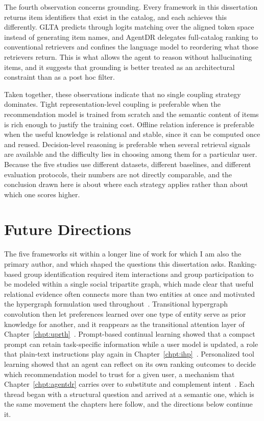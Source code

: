 The fourth observation concerns grounding. Every framework in this dissertation returns item identifiers that exist in the catalog, and each achieves this differently. GLTA predicts through logits matching over the aligned token space instead of generating item names, and AgentDR delegates full-catalog ranking to conventional retrievers and confines the language model to reordering what those retrievers return. This is what allows the agent to reason without hallucinating items, and it suggests that grounding is better treated as an architectural constraint than as a post hoc filter.

Taken together, these observations indicate that no single coupling strategy dominates. Tight representation-level coupling is preferable when the recommendation model is trained from scratch and the semantic content of items is rich enough to justify the training cost. Offline relation inference is preferable when the useful knowledge is relational and stable, since it can be computed once and reused. Decision-level reasoning is preferable when several retrieval signals are available and the difficulty lies in choosing among them for a particular user. Because the five studies use different datasets, different baselines, and different evaluation protocols, their numbers are not directly comparable, and the conclusion drawn here is about where each strategy applies rather than about which one scores higher.

\section{Future Directions}

The five frameworks sit within a longer line of work for which I am also the primary author, and which shaped the questions this dissertation asks. Ranking-based group identification required item interactions and group participation to be modeled within a single social tripartite graph, which made clear that useful relational evidence often connects more than two entities at once and motivated the hypergraph formulation used throughout~\cite{cfag}. Transitional hypergraph convolution then let preferences learned over one type of entity serve as prior knowledge for another, and it reappears as the transitional attention layer of Chapter~\ref{chpt:uprth}~\cite{gtgs}. Prompt-based continual learning showed that a compact prompt can retain task-specific information while a user model is updated, a role that plain-text instructions play again in Chapter~\ref{chpt:ihp}~\cite{pcl}. Personalized tool learning showed that an agent can reflect on its own ranking outcomes to decide which recommendation model to trust for a given user, a mechanism that Chapter~\ref{chpt:agentdr} carries over to substitute and complement intent~\cite{prta}. Each thread began with a structural question and arrived at a semantic one, which is the same movement the chapters here follow, and the directions below continue it.

